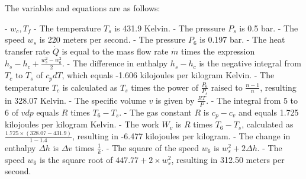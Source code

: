 The variables and equations are as follows:

- \( w_c, T_f \)
- The temperature \( T_s \) is 431.9 Kelvin.
- The pressure \( P_s \) is 0.5 bar.
- The speed \( w_s \) is 220 meters per second.
- The pressure \( P_6 \) is 0.197 bar.
- The heat transfer rate \( \dot{Q} \) is equal to the mass flow rate \( \dot{m} \) times the expression \( h_s - h_c + \frac{w_s^2 - w_6^2}{2} \).
- The difference in enthalpy \( h_s - h_c \) is the negative integral from \( T_c \) to \( T_s \) of \( c_p dT \), which equals -1.606 kilojoules per kilogram Kelvin.
- The temperature \( T_c \) is calculated as \( T_s \) times the power of \( \frac{P_6}{P_s} \) raised to \( \frac{n-1}{n} \), resulting in 328.07 Kelvin.
- The specific volume \( v \) is given by \( \frac{RT}{P} \).
- The integral from 5 to 6 of \( v dp \) equals \( R \) times \( T_6 - T_s \).
- The gas constant \( R \) is \( c_p - c_v \) and equals 1.725 kilojoules per kilogram Kelvin.
- The work \( W_v \) is \( R \) times \( T_6 - T_s \), calculated as \( \frac{1.725 \times (328.07 - 431.9)}{1 - 1.4} \), resulting in -6.477 kilojoules per kilogram.
- The change in enthalpy \( \Delta h \) is \( \Delta v \) times \( \frac{1}{k} \).
- The square of the speed \( w_6 \) is \( w_s^2 + 2 \Delta h \).
- The speed \( w_6 \) is the square root of \( 447.77 + 2 \times w_s^2 \), resulting in 312.50 meters per second.